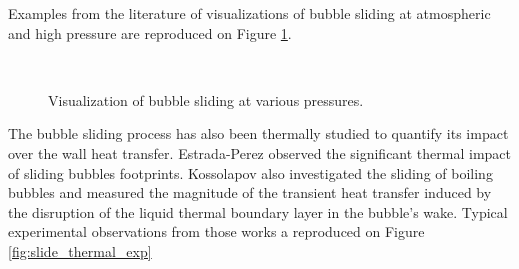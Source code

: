 Examples from the literature of visualizations of bubble sliding at atmospheric and high pressure are reproduced on Figure \ref{fig:slide_exp_vis}.

\begin{figure}[h!]

\begin{center}

\\

\end{center}

\caption{Visualization of bubble sliding at various pressures.}
\label{fig:slide_exp_vis}
\end{figure}

\npar

The bubble sliding process has also been thermally studied to quantify its impact over the wall heat transfer. Estrada-Perez \etal \cite{estrada-perez_time-resolved_2018} observed the significant thermal impact of sliding bubbles footprints. Kossolapov \cite{kossolapov_experimental_2021} also investigated the sliding of boiling bubbles and measured the magnitude of the transient heat transfer induced by the disruption of the liquid thermal boundary layer in the bubble's wake. Typical experimental observations from those works a reproduced on Figure \ref{fig:slide_thermal_exp}

